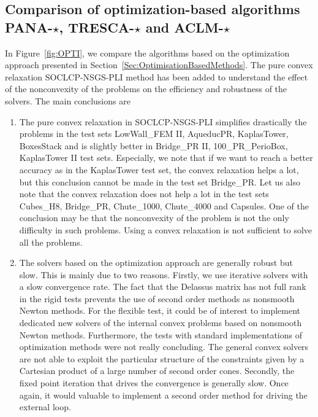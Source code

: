 \subsection{Comparison of optimization-based algorithms {\sf PANA-$\star$, TRESCA-$\star$ and ACLM-$\star$}}

In Figure~\ref{fig:OPTI}, we compare the algorithms based on the optimization approach presented in Section~\ref{Sec:OptimisationBasedMethods}. The pure convex relaxation {\sf SOCLCP-NSGS-PLI}  method has been added to understand the effect of the nonconvexity of the problems on the efficiency and robustness of the solvers. The main conclusions are
\begin{enumerate}
\item The pure convex relaxation in {\sf SOCLCP-NSGS-PLI}  simplifies drastically the problems in the test sets  LowWall\_FEM II, AqueducPR, KaplasTower, BoxesStack  and is slightly better in Bridge\_PR II, 100\_PR\_PerioBox, KaplasTower II test sets. Especially, we note that if we want to reach a better accuracy as in the KaplasTower test set, the convex relaxation helps a lot, but this conclusion cannot be made in the test set Bridge\_PR. Let us also note that  the convex relaxation does not help a lot in the test sets Cubes\_H8, Bridge\_PR, Chute\_1000, Chute\_4000 and Capsules. One of the conclusion may be that the nonconvexity of the problem is not the only difficulty in such problems. Using a convex relaxation is not sufficient to solve all the problems.
\item The solvers based on the optimization approach are generally robust but slow. This is mainly due to two reasons. Firstly,  we use iterative solvers with a slow convergence rate. The fact that  the Delassus matrix has not full rank in the rigid tests prevents the use of second order methods as nonsmooth Newton methods.  For the flexible test, it could be of interest to implement dedicated new solvers of the internal convex problems based on nonsmooth Newton methods. Furthermore, the tests with standard implementations of optimization methods were not really concluding. The general convex solvers are not  able to exploit the particular structure of the constraints given by a Cartesian product of a large number of second order cones. Secondly, the fixed point iteration that drives the convergence is generally slow. Once again, it would valuable to implement a second order method for driving the external loop.

\end{enumerate}
